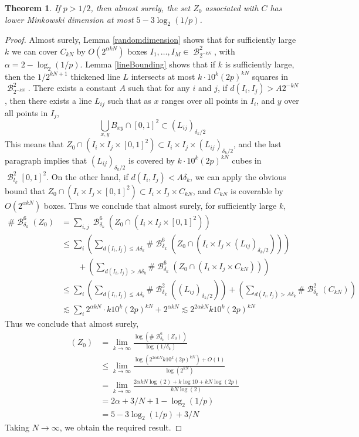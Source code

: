 \documentclass[dvipsnames,letterpaper,12pt]{article}
\numberwithin{equation}{section}
\theoremstyle{plain}
\newtheorem{theorem}{Theorem}
\DeclareMathOperator{\minkdim}{\dim_{\mathbf{M}}}
\DeclareMathOperator{\B}{\mathcal{B}}
\begin{document}
\begin{theorem}
	If $p > 1/2$, then almost surely, the set $Z_0$ associated with $C$ has lower Minkowski dimension at most $5 - 3 \log_2(1/p)$.
\end{theorem}
\begin{proof}
	Almost surely, Lemma \ref{randomdimension} shows that for sufficiently large $k$ we can cover $C_{kN}$ by $O(2^{\alpha kN})$ boxes $I_1, \dots, I_M \in \B^2_{2^{-kN}}$, with $\alpha = 2 - \log_2(1/p)$. Lemma \ref{lineBounding} shows that if $k$ is sufficiently large, then the $1/2^{kN+1}$ thickened line $L$ intersects at most $k \cdot 10^k (2p)^{kN}$ squares in $\B^2_{2^{-kN}}$. There exists a constant $A$ such that for any $i$ and $j$, if $d(I_i, I_j) > A 2^{-kN}$, then there exists a line $L_{ij}$ such that as $x$ ranges over all points in $I_i$, and $y$ over all points in $I_j$,
	\[ \bigcup_{x,y} B_{xy} \cap [0,1]^2 \subset (L_{ij})_{\delta_k/2} \]
	This means that $Z_0 \cap (I_i \times I_j \times [0,1]^2) \subset I_i \times I_j \times (L_{ij})_{\delta_k/2}$, and the last paragraph implies that $(L_{ij})_{\delta_k/2}$ is covered by $k \cdot 10^k (2p)^{kN}$ cubes in $\B^2_{l_k}[0,1]^2$. On the other hand, if $d(I_i,I_j) < A \delta_k$, we can apply the obvious bound that $Z_0 \cap (I_i \times I_j \times [0,1]^2) \subset I_i \times I_j \times C_{kN}$, and $C_{kN}$ is coverable by $O(2^{\alpha kN})$ boxes. Thus we conclude that almost surely, for sufficiently large $k$,
	\begin{align*}
		\# \B^6_{\delta_k}(Z_0) &= \sum_{i,j} \B^6_{\delta_k}(Z_0 \cap (I_i \times I_j \times [0,1]^2)) \\
		&\leq \sum_i \left( \sum_{d(I_i,I_j) \leq A \delta_k} \# \B^6_{\delta_k}(Z_0 \cap (I_i \times I_j \times (L_{ij})_{\delta_k/2})) \right)\\
		&\quad\quad+ \left( \sum_{d(I_i,I_j) > A \delta_k} \# \B^6_{\delta_k}(Z_0 \cap (I_i \times I_j \times C_{kN})) \right)\\
		&\leq \sum_i \left( \sum_{d(I_i,I_j) \leq A \delta_k} \# \B^2_{\delta_k}((L_{ij})_{\delta_k/2}) \right) + \left( \sum_{d(I_i,I_j) > A \delta_k} \# \B^2_{\delta_k}(C_{kN}) \right)\\
		&\lesssim \sum_i 2^{\alpha kN} \cdot k 10^k (2p)^{kN} + 2^{\alpha kN} \lesssim 2^{2\alpha kN} k 10^k (2p)^{kN}
	\end{align*}
	Thus we conclude that almost surely,
	\begin{align*}
		\minkdim(Z_0) &= \lim_{k \to \infty} \frac{\log \left( \# \B^6_{\delta_k}(Z_0) \right)}{\log(1/\delta_k)}\\
		&\leq \lim_{k \to \infty} \frac{\log(2^{2 \alpha kN} k 10^k (2p)^{kN}) + O(1)}{\log(2^{kN})}\\
		&= \lim_{k \to \infty} \frac{2 \alpha k N \log(2) + k \log 10 + kN \log(2p)}{kN \log(2)}\\
		&= 2 \alpha + 3/N + 1 - \log_2(1/p)\\
		&= 5 - 3\log_2(1/p) + 3/N
	\end{align*}
	Taking $N \to \infty$, we obtain the required result.
\end{proof}
\end{document}
